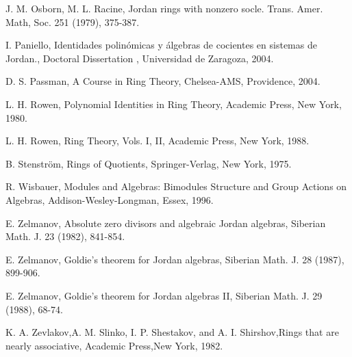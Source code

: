 \documentclass[a4paper,twoside,11pt]{article}
\theoremstyle{plain}
\theoremstyle{miestilo}
\theoremstyle{misnotas}
\begin{document}
\begin{thebibliography}{11111111}
  J. M. Osborn, M. L. Racine, Jordan rings with nonzero socle. Trans. Amer. Math, Soc. 251 (1979), 375-387.

  I. Paniello, Identidades polin\'{o}micas y \'{a}lgebras de cocientes en sistemas de Jordan., Doctoral Dissertation , Universidad de Zaragoza, 2004.

  D. S. Passman, A Course in Ring Theory, Chelsea-AMS, Providence, 2004.  

  L. H. Rowen,  Polynomial Identities in Ring Theory, Academic Press, New York, 1980.

   L. H. Rowen,  Ring Theory, Vols. I, II, Academic
Press, New York, 1988.

   B. Stenstr\"{o}m, Rings of Quotients, Springer-Verlag,
New York, 1975.

 R. Wisbauer, Modules and Algebras: Bimodules Structure and Group Actions on Algebras, Addison-Wesley-Longman, Essex, 1996.

 E. Zelmanov, Absolute zero divisors and algebraic Jordan algebras, Siberian Math. J. 23 (1982), 841-854.

 E. Zelmanov, Goldie's theorem for Jordan algebras, Siberian Math. J. 28 (1987), 899-906.

 E. Zelmanov, Goldie's theorem for Jordan algebras II, Siberian Math. J. 29 (1988), 68-74.


 K. A. Zevlakov,A. M. Slinko, I. P. Shestakov, and A. I. Shirshov,Rings that are nearly associative, Academic Press,New York, 1982.
















\end{thebibliography}
\end{document}
